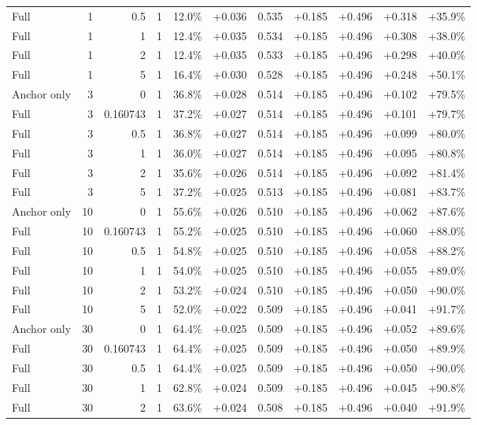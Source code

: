 \begin{table}[htbp]
\begin{tabular}{lrrrccccccc}
Full & 1 & 0.5 & 1 & 12.0\% & +0.036 & 0.535 & +0.185 & +0.496 & +0.318 & +35.9\% \\
Full & 1 & 1 & 1 & 12.4\% & +0.035 & 0.534 & +0.185 & +0.496 & +0.308 & +38.0\% \\
Full & 1 & 2 & 1 & 12.4\% & +0.035 & 0.533 & +0.185 & +0.496 & +0.298 & +40.0\% \\
Full & 1 & 5 & 1 & 16.4\% & +0.030 & 0.528 & +0.185 & +0.496 & +0.248 & +50.1\% \\
Anchor only & 3 & 0 & 1 & 36.8\% & +0.028 & 0.514 & +0.185 & +0.496 & +0.102 & +79.5\% \\
Full & 3 & 0.160743 & 1 & 37.2\% & +0.027 & 0.514 & +0.185 & +0.496 & +0.101 & +79.7\% \\
Full & 3 & 0.5 & 1 & 36.8\% & +0.027 & 0.514 & +0.185 & +0.496 & +0.099 & +80.0\% \\
Full & 3 & 1 & 1 & 36.0\% & +0.027 & 0.514 & +0.185 & +0.496 & +0.095 & +80.8\% \\
Full & 3 & 2 & 1 & 35.6\% & +0.026 & 0.514 & +0.185 & +0.496 & +0.092 & +81.4\% \\
Full & 3 & 5 & 1 & 37.2\% & +0.025 & 0.513 & +0.185 & +0.496 & +0.081 & +83.7\% \\
Anchor only & 10 & 0 & 1 & 55.6\% & +0.026 & 0.510 & +0.185 & +0.496 & +0.062 & +87.6\% \\
Full & 10 & 0.160743 & 1 & 55.2\% & +0.025 & 0.510 & +0.185 & +0.496 & +0.060 & +88.0\% \\
Full & 10 & 0.5 & 1 & 54.8\% & +0.025 & 0.510 & +0.185 & +0.496 & +0.058 & +88.2\% \\
Full & 10 & 1 & 1 & 54.0\% & +0.025 & 0.510 & +0.185 & +0.496 & +0.055 & +89.0\% \\
Full & 10 & 2 & 1 & 53.2\% & +0.024 & 0.510 & +0.185 & +0.496 & +0.050 & +90.0\% \\
Full & 10 & 5 & 1 & 52.0\% & +0.022 & 0.509 & +0.185 & +0.496 & +0.041 & +91.7\% \\
Anchor only & 30 & 0 & 1 & 64.4\% & +0.025 & 0.509 & +0.185 & +0.496 & +0.052 & +89.6\% \\
Full & 30 & 0.160743 & 1 & 64.4\% & +0.025 & 0.509 & +0.185 & +0.496 & +0.050 & +89.9\% \\
Full & 30 & 0.5 & 1 & 64.4\% & +0.025 & 0.509 & +0.185 & +0.496 & +0.050 & +90.0\% \\
Full & 30 & 1 & 1 & 62.8\% & +0.024 & 0.509 & +0.185 & +0.496 & +0.045 & +90.8\% \\
Full & 30 & 2 & 1 & 63.6\% & +0.024 & 0.508 & +0.185 & +0.496 & +0.040 & +91.9\% \\

\end{tabular}
\end{table}
